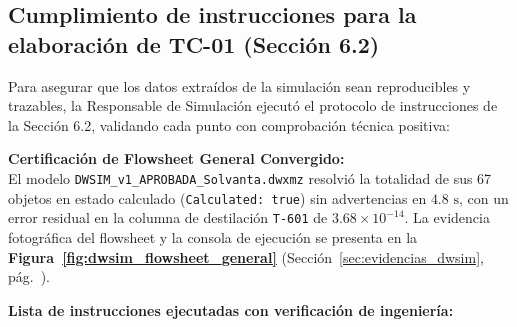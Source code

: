 \documentclass[11pt,letterpaper]{article}
\begin{document}
\vspace{0.1cm}
\subsection{Cumplimiento de instrucciones para la elaboración de TC-01 (Sección 6.2)}

Para asegurar que los datos extraídos de la simulación sean reproducibles y trazables, la Responsable de Simulación ejecutó el protocolo de instrucciones de la Sección 6.2, validando cada punto con comprobación técnica positiva:

\begin{tcolorbox}[colback=aliceblue!40,colframe=navyblue,arc=2pt,boxrule=0.7pt,left=8pt,right=8pt,top=3pt,bottom=3pt]
\small\textbf{\color{navyblue}Certificación de Flowsheet General Convergido:}\\
\footnotesize
El modelo \texttt{DWSIM\_v1\_APROBADA\_Solvanta.dwxmz} resolvió la totalidad de sus 67 objetos en estado calculado (\texttt{Calculated: true}) sin advertencias en $4.8\text{ s}$, con un error residual en la columna de destilación \texttt{T-601} de $3.68\times 10^{-14}$. La evidencia fotográfica del flowsheet y la consola de ejecución se presenta en la \textbf{Figura~\ref{fig:dwsim_flowsheet_general}} (Sección~\ref{sec:evidencias_dwsim}, pág.~\pageref{fig:dwsim_flowsheet_general}).
\end{tcolorbox}
\vspace{0.1cm}

\vspace{0.1cm}
\noindent\textbf{Lista de instrucciones ejecutadas con verificación de ingeniería:}
\end{document}
